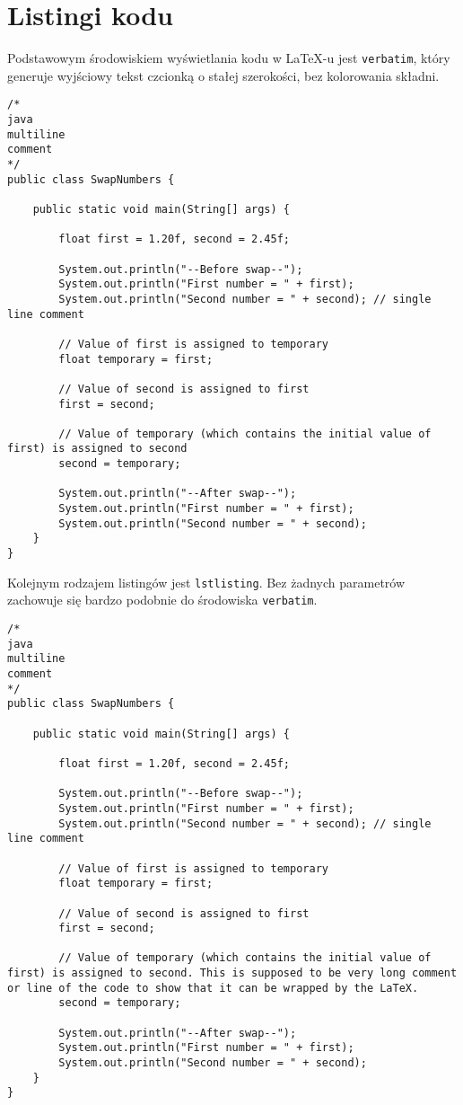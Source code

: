\chapter{Listingi kodu}

Podstawowym środowiskiem wyświetlania kodu w LaTeX-u jest \texttt{verbatim}, który generuje wyjściowy tekst czcionką o stałej szerokości, bez kolorowania składni.

\begin{verbatim}
/*
java
multiline
comment
*/
public class SwapNumbers {

    public static void main(String[] args) {

        float first = 1.20f, second = 2.45f;

        System.out.println("--Before swap--");
        System.out.println("First number = " + first);
        System.out.println("Second number = " + second); // single line comment

        // Value of first is assigned to temporary
        float temporary = first;

        // Value of second is assigned to first
        first = second;

        // Value of temporary (which contains the initial value of first) is assigned to second
        second = temporary;

        System.out.println("--After swap--");
        System.out.println("First number = " + first);
        System.out.println("Second number = " + second);
    }
}
\end{verbatim}

Kolejnym rodzajem listingów jest \texttt{lstlisting}. Bez żadnych parametrów zachowuje się bardzo podobnie do środowiska \texttt{verbatim}.

\begin{lstlisting}
/*
java
multiline
comment
*/
public class SwapNumbers {

    public static void main(String[] args) {

        float first = 1.20f, second = 2.45f;

        System.out.println("--Before swap--");
        System.out.println("First number = " + first);
        System.out.println("Second number = " + second); // single line comment

        // Value of first is assigned to temporary
        float temporary = first;

        // Value of second is assigned to first
        first = second;

        // Value of temporary (which contains the initial value of first) is assigned to second. This is supposed to be very long comment or line of the code to show that it can be wrapped by the LaTeX.
        second = temporary;

        System.out.println("--After swap--");
        System.out.println("First number = " + first);
        System.out.println("Second number = " + second);
    }
}
\end{lstlisting}


